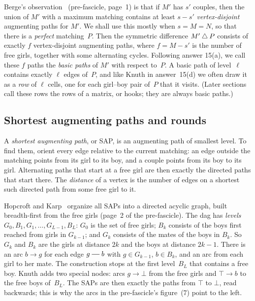 Berge's observation~\cite{Berge} (pre-fascicle, page~1) is that if $M'$ has
$s'$ couples, then the union of $M'$ with a maximum matching contains at
least $s-s'$ \emph{vertex-disjoint} augmenting paths for $M'$. We shall
use this mostly when $s=M=N$, so that there is a \emph{perfect}
matching~$P$. Then the symmetric difference $M'\mathbin{\triangle} P$ consists of
exactly $f$ vertex-disjoint augmenting paths, where $f=M-s'$ is the number
of free girls, together with some alternating cycles. Following answer
15(a), we call these $f$ paths the \emph{basic paths} of $M'$ with
respect to~$P$. A basic path of level~$\ell$ contains exactly $\ell$ edges
of~$P$, and like Knuth in answer~15(d) we often draw it as a \emph{row} of
$\ell$ cells, one for each girl--boy pair of~$P$ that it visits. (Later
sections call these rows the rows of a matrix, or hooks; they are always
basic paths.)

\subsection{Shortest augmenting paths and rounds}
\label{sec:dag}

A \emph{shortest augmenting path}, or SAP, is an augmenting path of
smallest level. To find them, orient every edge relative to the current
matching: an edge outside the matching points from its girl to its boy,
and a couple points from its boy to its girl. Alternating paths that start
at a free girl are then exactly the directed paths that start there. The
\emph{distance} of a vertex is the number of edges on a shortest such
directed path from some free girl to it.

Hopcroft and Karp~\cite{HK} organize all SAPs into a directed acyclic
graph, built breadth-first from the free girls (page~2 of the
pre-fascicle). The dag has \emph{levels} $G_0,B_1,G_1,\ldots,
G_{L-1},B_L$: $G_0$ is the set of free girls; $B_k$ consists of the
boys first reached from girls in $G_{k-1}$; and $G_k$ consists of the
mates of the boys in $B_k$. So $G_k$ and $B_k$ are the girls at distance
$2k$ and the boys at distance $2k-1$. There is an arc $b\to g$ for each edge
$g\sg b$ with $g\in G_{k-1}$, $b\in B_k$, and an arc from each girl to
her mate. The construction stops at the first level~$B_L$ that contains
a free boy. Knuth adds two special nodes: arcs $g\to\bot$ from the free
girls and $\top\to b$ to the free boys of~$B_L$. The SAPs are then
exactly the paths from $\top$ to $\bot$, read backwards; this is why the
arcs in the pre-fascicle's figure~(7) point to the left.

